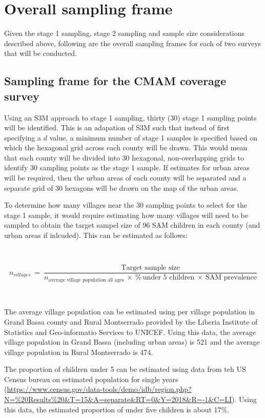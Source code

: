 \documentclass[12pt,a4paper]{book}
\theoremstyle{definition}
\theoremstyle{definition}
\theoremstyle{definition}
\theoremstyle{remark}
\begin{document}
\hypertarget{samplingframe}{%
\section{Overall sampling frame}\label{samplingframe}}

Given the stage 1 sampling, stage 2 sampling and sample size
considerations described above, following are the overall sampling
frames for each of two surveys that will be conducted.

\hypertarget{sampling-frame-for-the-cmam-coverage-survey}{%
\subsection{Sampling frame for the CMAM coverage
survey}\label{sampling-frame-for-the-cmam-coverage-survey}}

Using an S3M approach to stage 1 sampling, thirty (30) stage 1 sampling
points will be identified. This is an adapation of S3M such that instead
of first specifying a \(d\) value, a minimum number of stage 1 samples
is specified based on which the hexagonal grid across each county will
be drawn. This would mean that each county will be divided into 30
hexagonal, non-overlapping grids to identify 30 sampling points as the
stage 1 sample. If estimates for urban areas will be required, then the
urban areas of each county will be separated and a separate grid of 30
hexagons will be drawn on the map of the urban areas.

To determine how many villages near the 30 sampling points to select for
the stage 1 sample, it would require estimating how many villages will
need to be sampled to obtain the target sampel size of 96 SAM children
in each county (and urban areas if inlcuded). This can be estimated as
follows:

~

\[ n_{villages} ~ = ~ \frac{\text{Target sample size}}{n_{\text{average village population all ages}} ~ \times ~ \% ~ \text{under 5 children} ~ \times ~ \text{SAM prevalence}} \]

~

The average village population can be estimated using per village
population in Grand Bassa county and Rural Montserrado provided by the
Liberia Institute of Statistics and Geo-informatio Services to UNICEF.
Using this data, the average village population in Grand Bassa
(including urban areas) is 521 and the average village population in
Rural Montserrado is 474.

The proportion of children under 5 can be estimated using data from teh
US Census bureau on estimated population for single years
(\url{https://www.census.gov/data-tools/demo/idb/region.php?N=\%20Results\%20\&T=15\&A=separate\&RT=0\&Y=2018\&R=-1\&C=LI}).
Using this data, the estimated proportion of under five children is
about 17\%.
\end{document}
